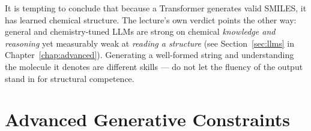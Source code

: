 \documentclass[11pt, oneside]{book}
\begin{document}
\begin{notebox}[title={``Chemistry LLM'' does not mean ``understands chemistry''}]
It is tempting to conclude that because a Transformer generates valid SMILES, it
has learned chemical structure. The lecture's own verdict points the other way:
general and chemistry-tuned LLMs are strong on chemical \emph{knowledge and
reasoning} yet measurably weak at \emph{reading a structure} (see
Section~\ref{sec:llms} in Chapter~\ref{chap:advanced}). Generating a well-formed
string and understanding the molecule it denotes are different skills --- do not
let the fluency of the output stand in for structural competence.
\end{notebox}

\newpage

\section{Advanced Generative Constraints}
\end{document}
